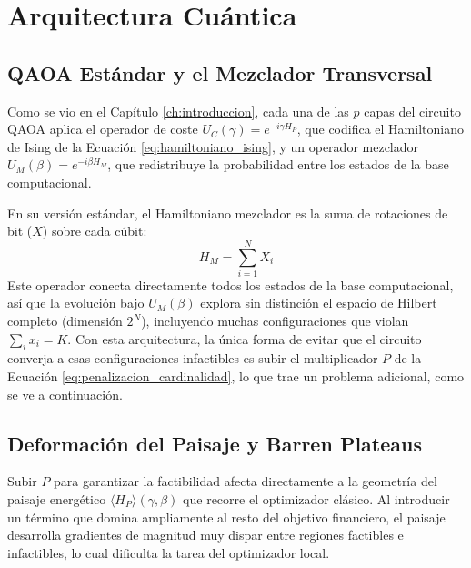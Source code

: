 \section{Arquitectura Cuántica}
\label{sec:arquitectura_cuantica}

\subsection{QAOA Estándar y el Mezclador Transversal}
\label{subsec:qaoa_estandar}

Como se vio en el Capítulo \ref{ch:introduccion}, cada una de las $p$ capas del circuito QAOA aplica el operador de coste $U_C(\gamma) = e^{-i\gamma H_P}$, que codifica el Hamiltoniano de Ising de la Ecuación \eqref{eq:hamiltoniano_ising}, y un operador mezclador $U_M(\beta) = e^{-i\beta H_M}$, que redistribuye la probabilidad entre los estados de la base computacional.

En su versión estándar, el Hamiltoniano mezclador es la suma de rotaciones de bit ($X$) sobre cada cúbit:
\begin{equation}
    H_M = \sum_{i=1}^N X_i
    \label{eq:mezclador_x}
\end{equation}
Este operador conecta directamente todos los estados de la base computacional, así que la evolución bajo $U_M(\beta)$ explora sin distinción el espacio de Hilbert completo (dimensión $2^N$), incluyendo muchas configuraciones que violan $\sum_i x_i = K$. Con esta arquitectura, la única forma de evitar que el circuito converja a esas configuraciones infactibles es subir el multiplicador $P$ de la Ecuación \eqref{eq:penalizacion_cardinalidad}, lo que trae un problema adicional, como se ve a continuación.

\subsection{Deformación del Paisaje y Barren Plateaus}
\label{subsec:barren_plateaus}

Subir $P$ para garantizar la factibilidad afecta directamente a la geometría del paisaje energético $\langle H_P \rangle (\gamma, \beta)$ que recorre el optimizador clásico. Al introducir un término que domina ampliamente al resto del objetivo financiero, el paisaje desarrolla gradientes de magnitud muy dispar entre regiones factibles e infactibles, lo cual dificulta la tarea del optimizador local.

